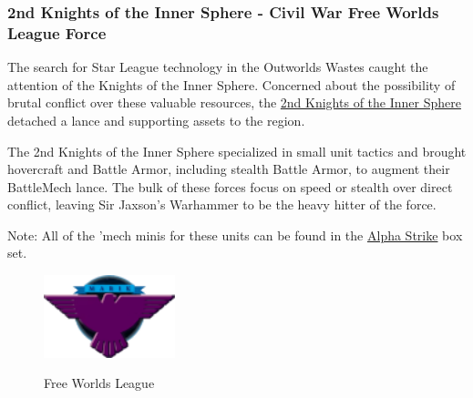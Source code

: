 \subsubsection{2nd Knights of the Inner Sphere - Civil War Free Worlds League Force}

The search for Star League technology in the Outworlds Wastes caught the attention of the Knights of the Inner Sphere.
Concerned about the possibility of brutal conflict over these valuable resources, the \href{https://www.sarna.net/wiki/2nd_Knights_of_the_Inner_Sphere}{2nd Knights of the Inner Sphere} detached a lance and supporting assets to the region.

The 2nd Knights of the Inner Sphere specialized in small unit tactics and brought hovercraft and Battle Armor, including stealth Battle Armor, to augment their BattleMech lance.
The bulk of these forces focus on speed or stealth over direct conflict, leaving Sir Jaxson's Warhammer to be the heavy hitter of the force.
          	
Note: All of the 'mech minis for these units can be found in the \href{https://www.sarna.net/wiki/Alpha_Strike_Boxed_Set}{Alpha Strike} box set. 

\begin{figure}[!h]
  \centering
  \includegraphics[alt='Free Worlds League Logo', width=1.5in, height=0.944in]{img/Free-Worlds-League.png}
  \caption*{Free Worlds League}
\end{figure}

